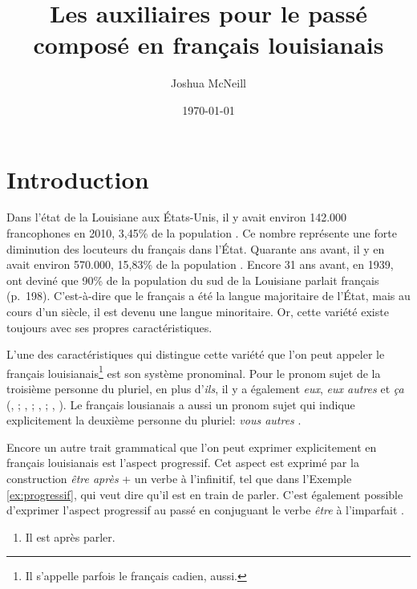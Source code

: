 \documentclass{article}
\author{Joshua McNeill}
\date{\today}
\title{Les auxiliaires pour le passé composé en français louisianais}
\newcommand{\lexi}[1]{\textit{#1}}
\begin{document}
  \maketitle
  \section{Introduction}
    Dans l'état de la Louisiane aux États-Unis, il y avait environ 142.000 francophones en 2010, 3,45\% de la population \parencite{mla_louisiana_nodate}.
    Ce nombre représente une forte diminution des locuteurs du français dans l'État.
    Quarante ans avant, il y en avait environ 570.000, 15,83\% de la population \parencite[p.~159]{us_department_of_commerce_1970_1973}.
    Encore 31 ans avant, en 1939, \textcite{smith_influence_1939} ont deviné que 90\% de la population du sud de la Louisiane parlait français (p.~198).
    C'est-à-dire que le français a été la langue majoritaire de l'État, mais au cours d'un siècle, il est devenu une langue minoritaire.
    Or, cette variété existe toujours avec ses propres caractéristiques.

    L'une des caractéristiques qui distingue cette variété que l'on peut appeler le français louisianais\footnote{Il s'appelle parfois le français cadien, aussi.} est son système pronominal.
    Pour le pronom sujet de la troisième personne du pluriel, en plus d'\lexi{ils}, il y a également \lexi{eux}, \lexi{eux autres} et \lexi{ça} (\citeauthor{brown_pronominal_1988}, \citeyear[pp.~152-153]{brown_pronominal_1988}; \citeauthor{byers_defining_1988}, \citeyear[pp.~88-92]{byers_defining_1988}; \citeauthor{rottet_language_1995}, \citeyear[p.~175]{rottet_language_1995}; \citeauthor{smith_morphosyntactic_1994}, \citeyear[p.~60]{smith_morphosyntactic_1994}).
    Le français lousianais a aussi un pronom sujet qui indique explicitement la deuxième personne du pluriel: \lexi{vous autres} \parencite[p.~175]{rottet_language_1995}.

    Encore un autre trait grammatical que l'on peut exprimer explicitement en français louisianais est l'aspect progressif.
    Cet aspect est exprimé par la construction \lexi{être après} + un verbe à l'infinitif, tel que dans l'Exemple \ref{ex:progressif}, qui veut dire qu'il est en train de parler.
    C'est également possible d'exprimer l'aspect progressif au passé en conjuguant le verbe \lexi{être} à l'imparfait \parencite[p.~102]{papen_structural_1997}.

    \begin{enumerate}
      \item \label{ex:progressif} Il est après parler.
    \end{enumerate}
\end{document}

